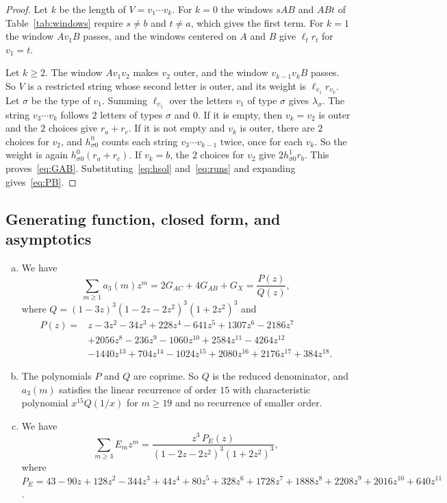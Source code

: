\begin{proof}
Let $k$ be the length of $V=v_1\cdots v_k$. For $k=0$ the windows $sAB$ and
$ABt$ of Table~\ref{tab:windows} require $s\ne b$ and $t\ne a$, which gives the
first term. For $k=1$ the window $Av_1B$ passes, and the windows centered on
$A$ and $B$ give $\ell_tr_t$ for $v_1=t$.

Let $k\ge2$. The window $Av_1v_2$ makes $v_2$ outer, and the window
$v_{k-1}v_kB$ passes. So $V$ is a restricted string whose second letter is
outer, and its weight is $\ell_{v_1}r_{v_k}$. Let $\sigma$ be the type of
$v_1$. Summing $\ell_{v_1}$ over the letters $v_1$ of type $\sigma$ gives
$\lambda_\sigma$. The string $v_3\cdots v_k$ follows $2$ letters of types
$\sigma$ and $0$. If it is empty, then $v_k=v_2$ is outer and the $2$ choices
give $r_a+r_c$. If it is not empty and $v_k$ is outer, there are $2$ choices
for $v_2$, and $h^0_{\sigma0}$ counts each string $v_3\cdots v_{k-1}$ twice,
once for each $v_k$. So the weight is again $h^0_{\sigma0}(r_a+r_c)$. If
$v_k=b$, the $2$ choices for $v_2$ give $2h^1_{\sigma0}r_b$. This
proves~\eqref{eq:GAB}. Substituting~\eqref{eq:hsol} and~\eqref{eq:runs} and
expanding gives~\eqref{eq:PB}.
\end{proof}

\subsection{Generating function, closed form, and asymptotics}

\begin{theorem}\label{thm:threegf}
\leavevmode
\begin{enumerate}[(a)]
\item We have
\begin{equation}\label{eq:PQ}
\sum_{m\ge1}a_3(m)z^m=2G_{AC}+4G_{AB}+G_X=\frac{P(z)}{Q(z)},
\end{equation}
where $Q=(1-3z)^3(1-2z-2z^2)^3(1+2z^2)^3$ and
\begin{align*}
P(z)={}&z-3z^2-34z^3+228z^4-641z^5+1307z^6-2186z^7\\
&+2056z^8-236z^9-1060z^{10}+2584z^{11}-4264z^{12}\\
&-1440z^{13}+704z^{14}-1024z^{15}+2080z^{16}+2176z^{17}+384z^{18}.
\end{align*}
\item The polynomials $P$ and $Q$ are coprime. So $Q$ is the reduced denominator,
and $a_3(m)$ satisfies the linear recurrence of order $15$ with characteristic
polynomial $x^{15}Q(1/x)$ for $m\ge19$ and no recurrence of smaller order.
\item We have
\[
\sum_{m\ge3}E_mz^m=\frac{z^3\,P_E(z)}{(1-2z-2z^2)^3(1+2z^2)^3},
\]
where $P_E=43-90z+128z^2-344z^3+44z^4+80z^5+328z^6+1728z^7+1888z^8+2208z^9
+2016z^{10}+640z^{11}$.
\end{enumerate}
\end{theorem}

